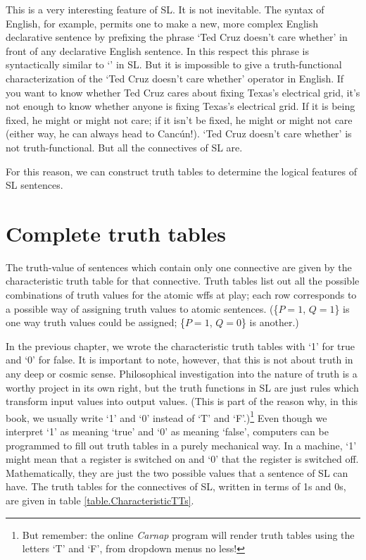 This is a very interesting feature of SL. It is not inevitable. The syntax of English, for example, permits one to make a new, more complex English declarative sentence by prefixing the phrase `Ted Cruz doesn't care whether' in front of any declarative English sentence. In this respect this phrase is syntactically similar to `\enot' in SL. But it is impossible to give a truth-functional characterization of the `Ted Cruz doesn't care whether' operator in English. {\color{black}If you want to know whether Ted Cruz cares about fixing Texas's electrical grid, it's not enough to know whether anyone is fixing Texas's electrical grid. If it is being fixed, he might or might not care; if it isn't be fixed, he might or might not care (either way, he can always head to Canc{\'u}n!)}. `Ted Cruz doesn't care whether' is not truth-functional. But all the connectives of SL are.

For this reason, we can construct truth tables to determine the logical features of SL sentences.

\section{Complete truth tables}
The truth-value of sentences which contain only one connective are given by the characteristic truth table for that connective. Truth tables list out all the possible combinations of truth values for the atomic wffs at play; each row corresponds to a possible way of assigning truth values to atomic sentences. (\{$P=1$, $Q=1$\} is one way truth values could be assigned; \{$P=1$, $Q=0$\} is another.)

In the previous chapter, we wrote the characteristic truth tables with `1' for true and `0' for false. It is important to note, however, that this is not about truth in any deep or cosmic sense. Philosophical investigation into the nature of truth is a worthy project in its own right, but the truth functions in SL are just rules which transform input values into output values. (This is part of the reason why, in this book, we usually write `1' and `0' instead of `T' and `F'.)\footnote{{\color{black} But remember: the online \textit{Carnap} program will render truth tables using the letters `T' and `F', from dropdown menus no less!}} Even though we interpret `1' as meaning `true' and `0' as meaning `false', computers can be programmed to fill out truth tables in a purely mechanical way. In a machine, `1' might mean that a register is switched on and `0' that the register is switched off. Mathematically, they are just the two possible values that a sentence of SL can have. The truth tables for the connectives of SL, written in terms of 1s and 0s, are given in table \ref{table.CharacteristicTTs}.

